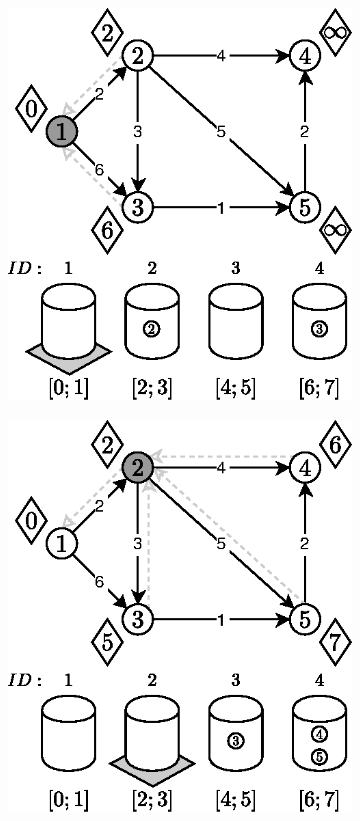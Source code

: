 \begin{figure}[!htbp]
\begin{subfigure}[b]{0.33\textwidth}
		\includegraphics[width=\textwidth]{Chapter_II/3/b.eps}
		\caption{}
	\end{subfigure}
	\begin{subfigure}[b]{0.33\textwidth}
		\includegraphics[width=\textwidth]{Chapter_II/3/c.eps}

\end{subfigure}
\end{figure}
